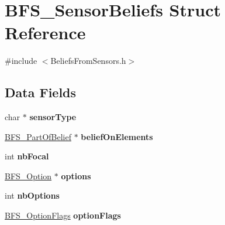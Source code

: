 \hypertarget{struct_b_f_s___sensor_beliefs}{\section{B\-F\-S\-\_\-\-Sensor\-Beliefs Struct Reference}
\label{struct_b_f_s___sensor_beliefs}
}


{\ttfamily \#include $<$Beliefs\-From\-Sensors.\-h$>$}

\subsection*{Data Fields}
\begin{DoxyCompactItemize}
\item 
\hypertarget{struct_b_f_s___sensor_beliefs_a0e4608088550200592587c681b7a8f74}{char $\ast$ {\bfseries sensor\-Type}}\label{struct_b_f_s___sensor_beliefs_a0e4608088550200592587c681b7a8f74}

\item 
\hypertarget{struct_b_f_s___sensor_beliefs_a818a0088a0be15ad2dcf2295bc4780e8}{\hyperlink{struct_b_f_s___part_of_belief}{B\-F\-S\-\_\-\-Part\-Of\-Belief} $\ast$ {\bfseries belief\-On\-Elements}}\label{struct_b_f_s___sensor_beliefs_a818a0088a0be15ad2dcf2295bc4780e8}

\item 
\hypertarget{struct_b_f_s___sensor_beliefs_af154415155c6b73acc53d18de0c615d9}{int {\bfseries nb\-Focal}}\label{struct_b_f_s___sensor_beliefs_af154415155c6b73acc53d18de0c615d9}

\item 
\hypertarget{struct_b_f_s___sensor_beliefs_ad4238c5803b0f94646e98aaed76db68f}{\hyperlink{struct_b_f_s___option}{B\-F\-S\-\_\-\-Option} $\ast$ {\bfseries options}}\label{struct_b_f_s___sensor_beliefs_ad4238c5803b0f94646e98aaed76db68f}

\item 
\hypertarget{struct_b_f_s___sensor_beliefs_a8356fb2585c0c61557ab4dce52070743}{int {\bfseries nb\-Options}}\label{struct_b_f_s___sensor_beliefs_a8356fb2585c0c61557ab4dce52070743}

\item 
\hypertarget{struct_b_f_s___sensor_beliefs_a5e8366f2f98089ee4e325dbabb598efc}{\hyperlink{_beliefs_from_sensors_8h_aa63e28a9dbd4627103f9bd3211cbcd6e}{B\-F\-S\-\_\-\-Option\-Flags} {\bfseries option\-Flags}}\label{struct_b_f_s___sensor_beliefs_a5e8366f2f98089ee4e325dbabb598efc}

\end{DoxyCompactItemize}


